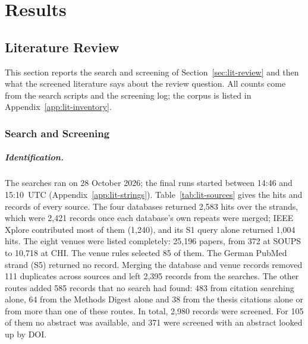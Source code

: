 \chapter{Results}
\label{ch:results}


\section{Literature Review}
\label{sec:results-lit}
This section reports the search and screening of Section~\ref{sec:lit-review}
and then what the screened literature says about the review question. All
counts come from the search scripts and the screening log; the corpus is listed
in Appendix~\ref{app:lit-inventory}.

\subsection{Search and Screening}

\paragraph{Identification.} The searches ran on 28 October 2026; the final runs
started between 14:46 and 15:10~UTC (Appendix~\ref{app:lit-strings}).
Table~\ref{tab:lit-sources} gives the hits and records of every source. The four
databases returned 2{,}583 hits over the strands, which were 2{,}421 records
once each database's own repeats were merged; IEEE Xplore contributed most of
them (1{,}240), and its S1 query alone returned 1{,}004 hits. The eight venues
were listed completely: 25{,}196 papers, from 372 at SOUPS to 10{,}718 at CHI.
The venue rules selected 85 of them. The German PubMed strand (S5) returned no
record. Merging the database and venue records removed 111 duplicates across
sources and left 2{,}395 records from the searches. The other routes added 585
records that no search had found: 483 from citation searching alone, 64 from the
Methods Digest alone and 38 from the thesis citations alone or from more than
one of these routes.
In total, 2{,}980 records were screened. For 105 of them no abstract was
available, and 371 were screened with an abstract looked up by DOI.

